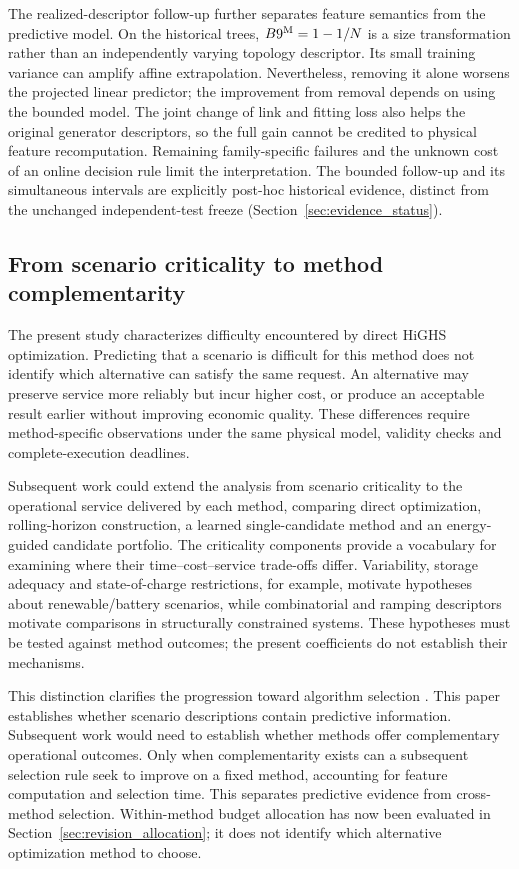 The realized-descriptor follow-up further separates feature semantics from
the predictive model. On the historical trees, $B9^{\rm M}=1-1/N$ is a size
transformation rather than an independently varying topology descriptor.
Its small training variance can amplify affine extrapolation. Nevertheless,
removing it alone worsens the projected linear predictor; the improvement
from removal depends on using the bounded model. The joint change of link
and fitting loss also helps the original generator descriptors, so the full
gain cannot be credited to physical feature recomputation. Remaining
family-specific failures and the unknown cost of an online decision rule
limit the interpretation. The bounded follow-up and its simultaneous
intervals are explicitly post-hoc historical evidence, distinct from the
unchanged independent-test freeze (Section~\ref{sec:evidence_status}).

\subsection{From scenario criticality to method complementarity}
The present study characterizes difficulty encountered by direct HiGHS
optimization. Predicting that a scenario is difficult for this method does
not identify which alternative can satisfy the same request. An alternative
may preserve service more reliably but incur higher cost, or produce an
acceptable result earlier without improving economic quality. These
differences require method-specific observations under the same physical
model, validity checks and complete-execution deadlines.

Subsequent work could extend the analysis from scenario criticality to
the operational service delivered by each method, comparing
direct optimization, rolling-horizon construction, a learned single-candidate
method and an energy-guided candidate portfolio. The criticality components
provide a vocabulary for examining where their time--cost--service trade-offs
differ. Variability, storage adequacy and state-of-charge restrictions, for
example, motivate hypotheses about renewable/battery scenarios, while
combinatorial and ramping descriptors motivate comparisons in structurally
constrained systems. These hypotheses must be tested against method outcomes;
the present coefficients do not establish their mechanisms.

This distinction clarifies the progression toward algorithm selection
\citep{rice1976,bischl2016}. This paper establishes whether scenario
descriptions contain predictive information. Subsequent work would need to
establish whether methods offer complementary operational outcomes. Only when complementarity
exists can a subsequent selection rule seek to improve on a fixed method,
accounting for feature computation and selection time. This separates
predictive evidence from cross-method selection. Within-method budget
allocation has now been evaluated in Section~\ref{sec:revision_allocation};
it does not identify which alternative optimization method to choose.

